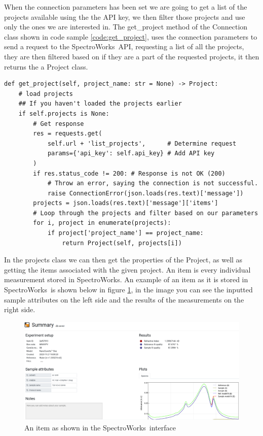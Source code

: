 \documentclass{article}
\newenvironment{code}{\captionsetup{type=listing}}{}
\begin{document}
When the connection parameters has been set we are going to get a list of the projects available using the the API key, we then filter those projects and use only the ones we are interested in.
The get\_project method of the Connection class shown in code sample \ref{code:get_project}, uses the connection parameters to send a request to the SpectroWorks\texttrademark\ API, requesting a list of all the projects, they are then filtered based on if they are a part of the requested projects, it then returns the a Project class.

\begin{code}
\begin{verbatim}
def get_project(self, project_name: str = None) -> Project:
    # load projects
    ## If you haven't loaded the projects earlier
    if self.projects is None:
        # Get response
        res = requests.get(
            self.url + 'list_projects',      # Determine request
            params={'api_key': self.api_key} # Add API key
        )
        if res.status_code != 200: # Response is not OK (200)
            # Throw an error, saying the connection is not successful.
            raise ConnectionError(json.loads(res.text)['message'])
        projects = json.loads(res.text)['message']['items']
        # Loop through the projects and filter based on our parameters
        for i, project in enumerate(projects):
            if project['project_name'] == project_name:
                return Project(self, projects[i])
\end{verbatim}
\label{code:get_project}
\end{code}
\medskip
In the projects class we can then get the properties of the Project, as well as getting the items associated with the given project.
An item is every individual measurement stored in SpectroWorks\texttrademark.
An example of an item as it is stored in SpectroWorks\texttrademark\ is shown below in figure \ref{fig:spectroworks_item}, in the image you can see the inputted sample attributes on the left side and the results of the measurements on the right side.

\begin{figure}[H]
    \centering
    \includegraphics[width=\textwidth]{item_spectroworks.png}
    \caption{An item as shown in the SpectroWorks\texttrademark\ interface\cite{spectroworks_app}}
    \label{fig:spectroworks_item}
\end{figure}
\end{document}
